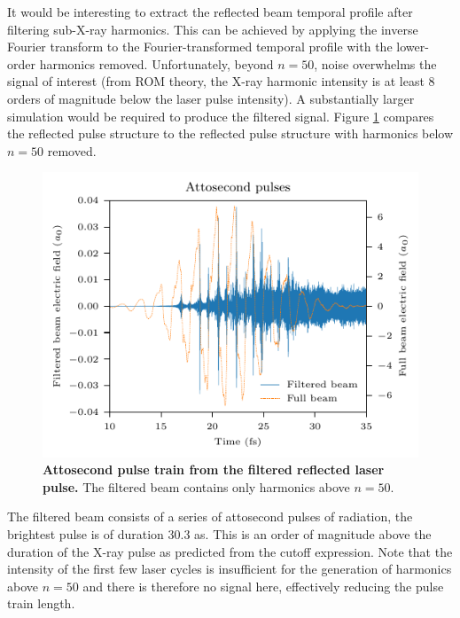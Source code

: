 It would be interesting to extract the reflected beam temporal profile after filtering sub-X-ray harmonics. This can be achieved by applying the inverse Fourier transform to the Fourier-transformed temporal profile with the lower-order harmonics removed. Unfortunately, beyond $n=50$, noise overwhelms the signal of interest (from ROM theory, the X-ray harmonic intensity is at least 8 orders of magnitude below the laser pulse intensity). A substantially larger simulation would be required to produce the filtered signal. Figure \ref{fig:orionattosecondpulse} compares the reflected pulse structure to the reflected pulse structure with harmonics below $n = 50$ removed. 
\begin{figure}
	\centering
	\includegraphics{figures/orion/orion_attosecond_pulse}
	\caption[Attosecond pulse train from the filtered reflected laser pulse.]{\textbf{Attosecond pulse train from the filtered reflected laser pulse.} The filtered beam contains only harmonics above $n = 50$.}
	\label{fig:orionattosecondpulse}
\end{figure}
The filtered beam consists of a series of attosecond pulses of radiation, the brightest pulse is of duration 30.3 as. This is an order of magnitude above the duration of the X-ray pulse as predicted from the cutoff expression. Note that the intensity of the first few laser cycles is insufficient for the generation of harmonics above $n = 50$ and there is therefore no signal here, effectively reducing the pulse train length.


